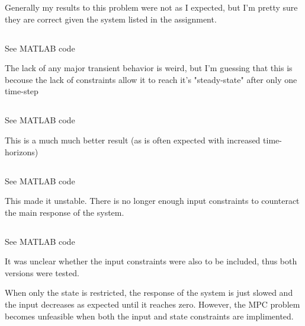 \documentclass[]{article}
\begin{document}
Generally my results to this problem were not as I expected, but I'm pretty sure they are correct given the system listed in the assignment.

\subsection{}
See MATLAB code

The lack of any major transient behavior is weird, but I'm guessing that this is becouse the lack of constraints allow it to reach it's "steady-state" after only one time-step

\subsection{}
See MATLAB code

This is a much much better result (as is often expected with increased time-horizons)


\subsection{}
See MATLAB code

This made it unstable.
There is no longer enough input constraints to counteract the main response of the system.

\subsection{}
See MATLAB code

It was unclear whether the input constraints were also to be included, thus both versions were tested.

When only the state is restricted, the response of the system is just slowed and the input decreases as expected until it reaches zero.
However, the MPC problem becomes unfeasible when both the input and state constraints are implimented.




\end{document}
